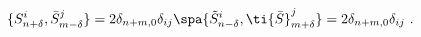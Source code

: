 \begin{equation}
\{S^i_{n+\delta},\bar{S}^j_{m-\delta}\}=2\delta_{n+m,0}\delta_{ij}
\spa
\{\tilde{S}^i_{n-\delta},\ti{\bar{S}}^j_{m+\delta}\}
=2\delta_{n+m,0}\delta_{ij} \ .
\end{equation}


